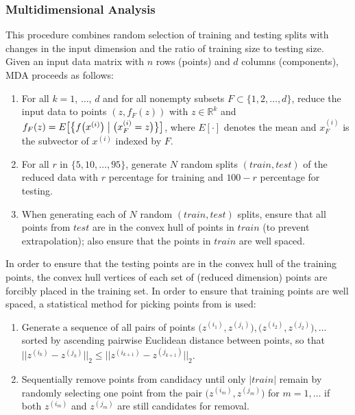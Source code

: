 \documentclass{scspaperproc}
\theoremstyle{scsthe}
\begin{document}
\subsubsection{Multidimensional Analysis}
\vspace{-10pt}
This procedure combines random selection of training and testing
splits with changes in the input dimension and the ratio of training
size to testing size. Given an input data matrix with $n$ rows
(points) and $d$ columns (components), MDA proceeds as follows:
\begin{enumerate}
\item For all $k = 1$, $\ldots$, $d$ and for all nonempty subsets $F
  \subset \{1, 2, \ldots, d\}$, reduce the input data to points $(z,
  f_F(z))$ with $z \in \mathbb{R}^k$ and $f_F(z) = E\bigl[ \bigl\{
    f\bigl(x^{(i)}\bigr) \bigm| \bigl(x^{(i)}_F = z\bigr) \bigr\}
    \bigr]$, where $E[\cdot]$ denotes the mean and $x^{(i)}_F$ is the
  subvector of $x^{(i)}$ indexed by $F$.
\item For all $r$ in $\{5, 10, \ldots, 95\}$, generate $N$ random
  splits $(train, test)$ of the reduced data with $r$ percentage for
  training and $100 - r$ percentage for testing.
\item When generating each of $N$ random $(train, test)$ splits,
  ensure that all points from $test$ are in the convex hull of points
  in $train$ (to prevent extrapolation); also ensure that the points
  in $train$ are well spaced.
\end{enumerate}

In order to ensure that the testing points are in the convex hull of
the training points, the convex hull vertices of each set of (reduced
dimension) points are forcibly placed in the training set. In order to
ensure that training points are well spaced, a statistical method for
picking points from  is used:
\begin{enumerate}
\item Generate a sequence of all pairs of points
  $\bigl(z^{(i_1)},z^{(j_1)}\bigr), \bigl(z^{(i_2)},z^{(j_2)}\bigr),
  \ldots$ sorted by ascending pairwise Euclidean distance between
  points, so that $\bigl|\bigl|z^{(i_k)}-z^{(j_k)}\bigr|\bigr|_2 \leq
  \bigl|\bigl|z^{(i_{k+1})}-z^{(j_{k+1})}\bigr|\bigr|_2$.
\item Sequentially remove points from candidacy until only $|train|$
  remain by randomly selecting one point from the pair
  $\bigl(z^{(i_m)}, z^{(j_m)}\bigr)$ for $m = 1,\ldots$ if both
  $z^{(i_m)}$ and $z^{(j_m)}$ are still candidates for removal.
\end{enumerate}
\end{document}
